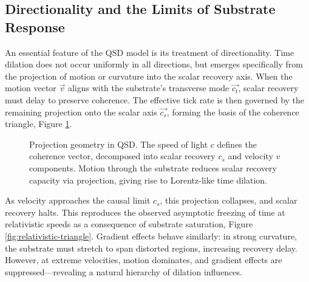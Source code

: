 \documentclass[entropy,article,submit,pdftex,moreauthors]{Definitions/mdpi}
\begin{document}
\subsection{Directionality and the Limits of Substrate Response}

An essential feature of the QSD model is its treatment of directionality. Time dilation does not occur uniformly in all directions, but emerges specifically from the projection of motion or curvature into the scalar recovery axis. When the motion vector \( \vec{v} \) aligns with the substrate’s transverse mode \( \vec{c_t} \), scalar recovery must delay to preserve coherence. The effective tick rate is then governed by the remaining projection onto the scalar axis \( \vec{c_s} \), forming the basis of the coherence triangle, Figure \ref{fig:coherence-triangle}.

\begin{figure}[ht]
\centering
{}
\caption{Projection geometry in QSD. The speed of light \( c \) defines the coherence vector, decomposed into scalar recovery \( c_s \) and velocity \( v \) components. Motion through the substrate reduces scalar recovery capacity via projection, giving rise to Lorentz-like time dilation.}
\label{fig:coherence-triangle}
\end{figure}

As velocity approaches the causal limit \( c_s \), this projection collapses, and scalar recovery halts. This reproduces the observed asymptotic freezing of time at relativistic speeds as a consequence of substrate saturation, Figure \ref{fig:relativistic-triangle}. Gradient effects behave similarly: in strong curvature, the substrate must stretch to span distorted regions, increasing recovery delay. However, at extreme velocities, motion dominates, and gradient effects are suppressed—revealing a natural hierarchy of dilation influences.
\end{document}
